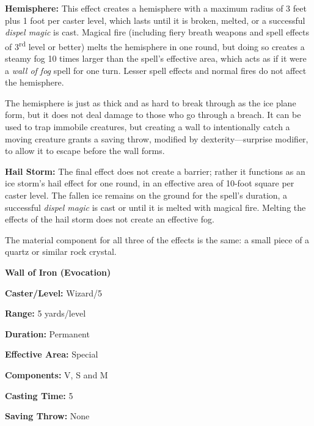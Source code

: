 \begin{multicols}{2}
\textbf{Hemisphere:} This effect creates a hemisphere with a maximum radius of 3 feet plus 1 foot per caster level, which lasts until it is broken, melted, or a successful \textit{dispel magic} is cast.  Magical fire (including fiery breath weapons and spell effects of 3\textsuperscript{rd} level or better) melts the hemisphere in one round, but doing so creates a steamy fog 10 times larger than the spell's effective area, which acts as if it were a \textit{wall of fog} spell for one turn.  Lesser spell effects and normal fires do not affect the hemisphere.

The hemisphere is just as thick and as hard to break through as the ice plane form, but it does not deal damage to those who go through a breach.  It can be used to trap immobile creatures, but creating a wall to intentionally catch a moving creature grants a saving throw, modified by dexterity---surprise modifier, to allow it to escape before the wall forms.

\textbf{Hail Storm:} The final effect does not create a barrier; rather it functions as an ice storm's hail effect for one round, in an effective area of 10-foot square per caster level.  The fallen ice remains on the ground for the spell's duration, a successful \textit{dispel magic} is cast or until it is melted with magical fire.  Melting the effects of the hail storm does not create an effective fog.

The material component for all three of the effects is the same: a small piece of a quartz or similar rock crystal.

\vspace{1em}

\noindent
\begin{minipage}{\columnwidth}

\noindent \textbf{Wall of Iron (Evocation)}

\noindent \textbf{Caster/Level:} Wizard/5

\noindent \textbf{Range:} 5 yards/level

\noindent \textbf{Duration:} Permanent

\noindent \textbf{Effective Area:} Special

\noindent \textbf{Components:} V, S and M

\noindent \textbf{Casting Time:} 5

\noindent \textbf{Saving Throw:} None

\end{minipage}


\end{multicols}
